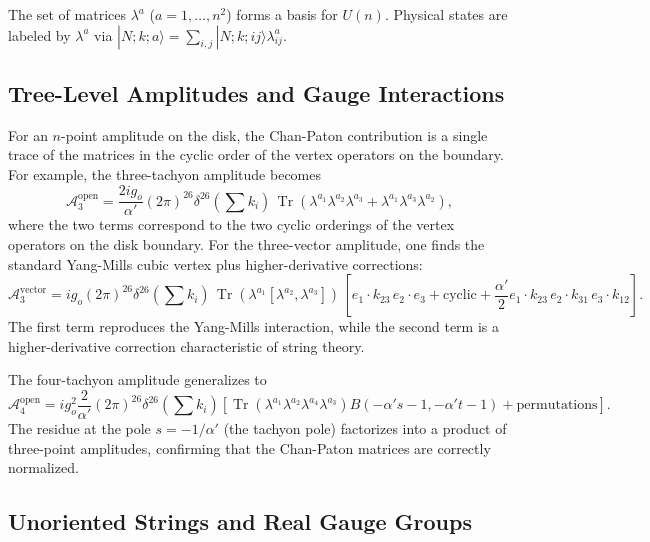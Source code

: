 \documentclass[11pt]{article}
\begin{document}
The set of matrices $\lambda^a$ ($a=1,\dots,n^2$) forms a basis for $U(n)$. Physical states are labeled by $\lambda^a$ via $|N; k; a\rangle = \sum_{i,j} |N; k; ij\rangle \lambda^a_{ij}$.

\subsection{Tree-Level Amplitudes and Gauge Interactions}

For an $n$-point amplitude on the disk, the Chan-Paton contribution is a single trace of the matrices in the cyclic order of the vertex operators on the boundary. For example, the three-tachyon amplitude becomes
\begin{equation}
\mathcal{A}_3^{\text{open}} = \frac{2ig_o}{\alpha'} (2\pi)^{26} \delta^{26}(\sum k_i) \, \operatorname{Tr}(\lambda^{a_1}\lambda^{a_2}\lambda^{a_3} + \lambda^{a_1}\lambda^{a_3}\lambda^{a_2}),
\end{equation}
where the two terms correspond to the two cyclic orderings of the vertex operators on the disk boundary. For the three-vector amplitude, one finds the standard Yang-Mills cubic vertex plus higher-derivative corrections:
\begin{equation}
\mathcal{A}_3^{\text{vector}} = i g_o (2\pi)^{26} \delta^{26}(\sum k_i) \, \operatorname{Tr}(\lambda^{a_1}[\lambda^{a_2},\lambda^{a_3}]) \, \left[ e_1\cdot k_{23} \, e_2\cdot e_3 + \text{cyclic} + \frac{\alpha'}{2} e_1\cdot k_{23} \, e_2\cdot k_{31} \, e_3\cdot k_{12} \right].
\end{equation}
The first term reproduces the Yang-Mills interaction, while the second term is a higher-derivative correction characteristic of string theory.

The four-tachyon amplitude generalizes to
\begin{equation}
\mathcal{A}_4^{\text{open}} = i g_o^2 \frac{2}{\alpha'} (2\pi)^{26} \delta^{26}(\sum k_i) \left[ \operatorname{Tr}(\lambda^{a_1}\lambda^{a_2}\lambda^{a_4}\lambda^{a_3}) B(-\alpha's-1,-\alpha't-1) + \text{permutations} \right].
\end{equation}
The residue at the pole $s = -1/\alpha'$ (the tachyon pole) factorizes into a product of three-point amplitudes, confirming that the Chan-Paton matrices are correctly normalized.

\subsection{Unoriented Strings and Real Gauge Groups}
\end{document}
